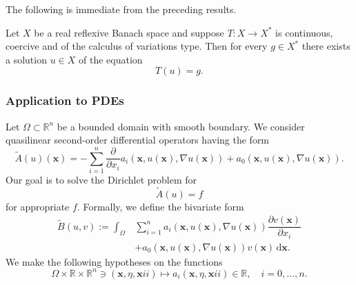The following is immediate from the preceding results.

\begin{Corollary}
\label{cor:cv-type-surjectivity}
Let $X$ be a real reflexive Banach space and suppose $T:X\to X^*$ is continuous, coercive and of the calculus of variations type. Then for every $g\in X^*$ there exists a solution $u\in X$ of the equation
\begin{equation}\label{eq:calculus-variations-type-surjectivity-equation}
T(u)=g.
\end{equation}

\end{Corollary}

\subsubsection{Application to PDEs}\label{subsec:cv-type-application-to-pdes}

Let $\Omega\subset\mathbb{R}^n$ be a bounded domain with smooth boundary. We consider quasilinear second-order differential operators having the form
\begin{equation}\label{eq:cv-quasilinear-second-order-operator}
\widetilde A(u)(\bm{x})=-\sum_{i=1}^n\dfrac{\partial}{\partial x_i}a_i(\bm{x},u(\bm{x}),\nabla u(\bm{x}))+a_0(\bm{x},u(\bm{x}),\nabla u(\bm{x})).
\end{equation}
Our goal is to solve the Dirichlet problem for
\begin{equation}\label{eq:cv-quasilinear-dirichlet-equation}
\widetilde A(u)=f
\end{equation}
for appropriate $f$. Formally, we define the bivariate form
\begin{equation}\label{eq:cv-quasilinear-bivariate-form}
\begin{aligned}\widetilde B(u,v):=\int_\Omega&\sum_{i=1}^n a_i(\bm{x},u(\bm{x}),\nabla u(\bm{x}))\dfrac{\partial v(\bm{x})}{\partial x_i}\\&+a_0(\bm{x},u(\bm{x}),\nabla u(\bm{x}))v(\bm{x})\,\mathrm{d}\bm{x}.\end{aligned}
\end{equation}
We make the following hypotheses on the functions
\begin{equation}\label{eq:cv-pde-coefficient-functions-domain}
\Omega\times\mathbb{R}\times\mathbb{R}^n\ni(\bm{x},\eta,\bm{x}ii)\mapsto a_i(\bm{x},\eta,\bm{x}ii)\in\mathbb{R},\quad i=0,\ldots,n.
\end{equation}


